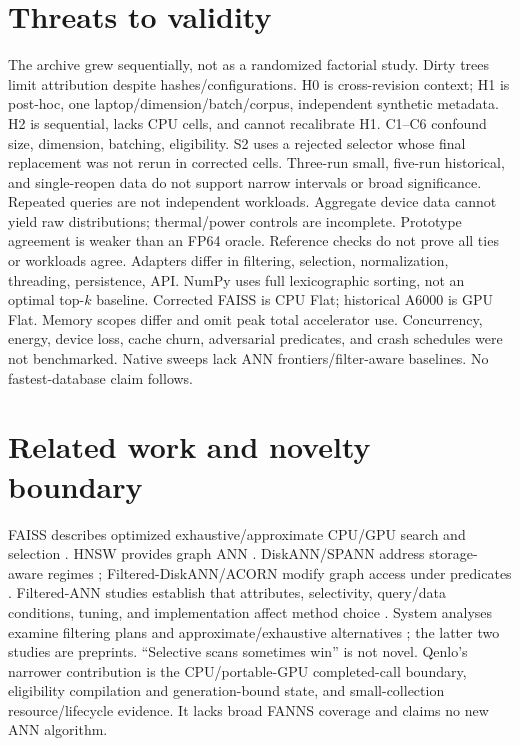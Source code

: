 \documentclass[10pt]{article}
\begin{document}
\section{Threats to validity}
The archive grew sequentially, not as a randomized factorial study. Dirty trees limit attribution despite hashes/configurations. H0 is cross-revision context; H1 is post-hoc, one laptop/dimension/batch/corpus, independent synthetic metadata. H2 is sequential, lacks CPU cells, and cannot recalibrate H1. C1--C6 confound size, dimension, batching, eligibility. S2 uses a rejected selector whose final replacement was not rerun in corrected cells.
Three-run small, five-run historical, and single-reopen data do not support narrow intervals or broad significance. Repeated queries are not independent workloads. Aggregate device data cannot yield raw distributions; thermal/power controls are incomplete. Prototype agreement is weaker than an FP64 oracle. Reference checks do not prove all ties or workloads agree.
Adapters differ in filtering, selection, normalization, threading, persistence, API. NumPy uses full lexicographic sorting, not an optimal top-$k$ baseline. Corrected FAISS is CPU Flat; historical A6000 is GPU Flat. Memory scopes differ and omit peak total accelerator use. Concurrency, energy, device loss, cache churn, adversarial predicates, and crash schedules were not benchmarked. Native sweeps lack ANN frontiers/filter-aware baselines. No fastest-database claim follows.

\section{Related work and novelty boundary}
FAISS describes optimized exhaustive/approximate CPU/GPU search and selection \citep{johnson2019billion,douze2024faiss}. HNSW provides graph ANN \citep{malkov2020hnsw}. DiskANN/SPANN address storage-aware regimes \citep{subramanya2019diskann,chen2021spann}; Filtered-DiskANN/ACORN modify graph access under predicates \citep{gollapudi2023filtered,patel2024acorn}.
Filtered-ANN studies establish that attributes, selectivity, query/data conditions, tuning, and implementation affect method choice \citep{iff2026fanns,li2025attribute,shi2025unified}. System analyses examine filtering plans and approximate/exhaustive alternatives \citep{amanbayev2026systems}; the latter two studies are preprints. ``Selective scans sometimes win'' is not novel. Qenlo's narrower contribution is the CPU/portable-GPU completed-call boundary, eligibility compilation and generation-bound state, and small-collection resource/lifecycle evidence. It lacks broad FANNS coverage and claims no new ANN algorithm.
\end{document}
